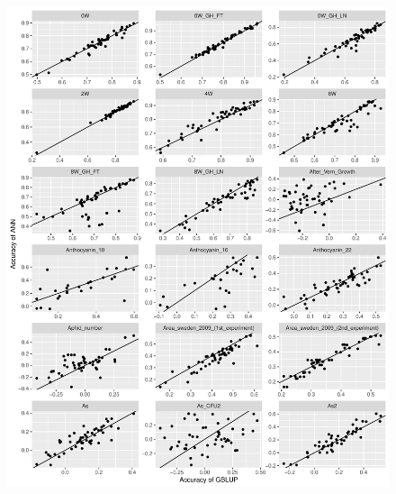 \begin{figure}[H]
  \centering \includegraphics[height=1.05\textheight, width=1.1\textwidth]{Figures/cor_plots_0}
  \decoRule
 \label{fig:bla}
\end{figure}

